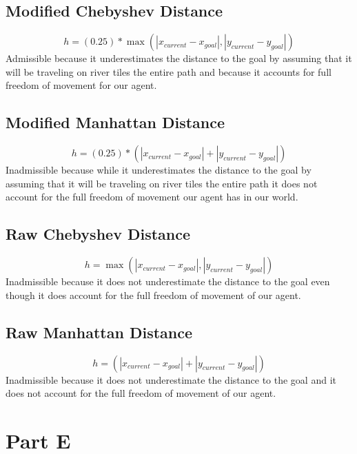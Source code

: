 \documentclass[12pt]{article}
\begin{document}
\subsection{Modified Chebyshev Distance}
  \[ h = (0.25) * \max( | x_{current} - x_{goal} |, | y_{current} - y_{goal} | )\]
\newline
Admissible because it underestimates the distance to the goal by assuming that it will be traveling on river tiles the entire path and because it accounts for full freedom of movement for our agent.
\subsection{Modified Manhattan Distance}
\[ h = (0.25) * ( | x_{current} - x_{goal} | + | y_{current} - y_{goal} | )\]
\newline
Inadmissible because while it underestimates the distance to the goal by assuming that it will be traveling on river tiles the entire path it does not account for the full freedom of movement our agent has in our world.
\subsection{Raw Chebyshev Distance}
 \[ h = \max( | x_{current} - x_{goal} |, | y_{current} - y_{goal} | )\]
\newline
Inadmissible because it does not underestimate the distance to the goal even though it does account for the full freedom of movement of our agent.
\subsection{Raw Manhattan Distance}
\[ h =  ( | x_{current} - x_{goal} | + | y_{current} - y_{goal} | )\] 
Inadmissible because it does not underestimate the distance to the goal and it does not account for the full freedom of movement of our agent.

\section{Part E}
\end{document}
